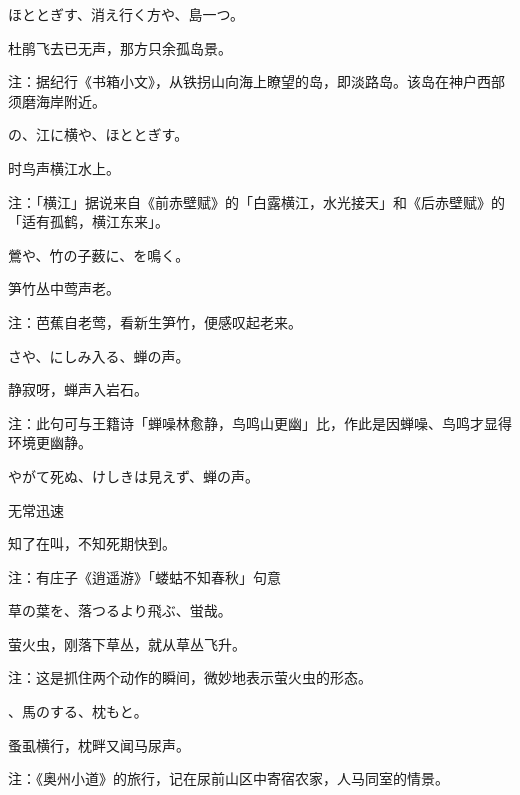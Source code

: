 \begin{haiku}
    {\FH ほととぎす、消え行く方や、島一つ。}

    {\FK 杜鹃飞去已无声，那方只余孤岛景。}

    {\FT 注：据纪行《书箱小文》，从铁拐山向海上瞭望的岛，即淡路岛。该岛在神户西部须磨海岸附近。}
\end{haiku}

\begin{haiku}
    {\FH {}の、江に横や、ほととぎす。}

    {\FK 时鸟声横江水上。}

    {\FT 注：「横江」据说来自《前赤壁赋》的「白露横江，水光接天」和《后赤壁赋》的「适有孤鹤，横江东来」。}
\end{haiku}

\begin{haiku}
    {\FH 鶯や、竹の子薮に、を鳴く。}

    {\FK 笋竹丛中莺声老。}

    {\FT 注：芭蕉自老莺，看新生笋竹，便感叹起老来。}
\end{haiku}

\begin{haiku}
    {\FH {}さや、にしみ入る、蝉の声。}

    {\FK 静寂呀，蝉声入岩石。}

    {\FT 注：此句可与王籍诗「蝉噪林愈静，鸟鸣山更幽」比，作此是因蝉噪、鸟鸣才显得环境更幽静。}
\end{haiku}

\begin{haiku}
    {\FH やがて死ぬ、けしきは見えず、蝉の声。}

    {\FK 无常迅速}

    {\FK 知了在叫，不知死期快到。}

    {\FT 注：有庄子《逍遥游》「蝼蛄不知春秋」句意}
\end{haiku}

\begin{haiku}
    {\FH 草の葉を、落つるより飛ぶ、蛍哉。}

    {\FK 萤火虫，刚落下草丛，就从草丛飞升。}

    {\FT 注：这是抓住两个动作的瞬间，微妙地表示萤火虫的形态。}
\end{haiku}

\begin{haiku}
    {\FH {}、馬のする、枕もと。}

    {\FK 蚤虱横行，枕畔又闻马尿声。}

    {\FT 注：《奥州小道》的旅行，记在尿前山区中寄宿农家，人马同室的情景。}
\end{haiku}

